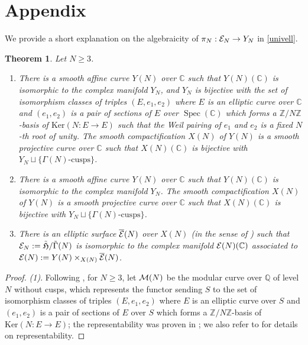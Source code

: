\documentclass[12pt,amstex,amssymb]{article}
\theoremstyle{plain}
\newtheorem{theorem}{Theorem}[subsection]
\theoremstyle{definition}
\def\cE{{\cal E}}
\def\fH{{\frak H}}
\def\cM{{\cal M}}
\def\Z{{\mathbb Z}}
\def\C{{\mathbb C}}
\def\Q{{\mathbb Q}}
\def\Ker{\text{Ker}}
\newcommand{\Spec}{\operatorname{Spec}}
\begin{document}
{\section{Appendix} \label{appendix}
We provide a short explanation on the algebraicity of $\pi_N:\cE_N \to Y_N$ in \eqref{univell}.
\begin{theorem}
    Let $N \geq 3$. 
    \begin{enumerate}[(1)]
            \item There is a smooth affine curve $Y(N)$ over $\C$ such that $Y(N)(\C)$ is isomorphic to the complex manifold $Y_N$, and $Y_N$ is bijective with the set of isomorphism classes of triples $(E,e_1,e_2)$ where $E$ is an elliptic curve over $\C$ and $(e_1,e_2)$ is a pair of sections of $E$ over $\Spec(\C)$ which forms a $\Z/N\Z$-basis of $\Ker(N:E \to E)$ such that the Weil pairing of $e_1$ and $e_2$ is a fixed $N$-th root of unity.
        The smooth compactification $X(N)$ of $Y(N)$ is a smooth projective curve over $\C$ such that  $X(N)(\C)$ is bijective with $Y_N \sqcup \{\Gamma(N)\text{-cusps}\}$.
        \item There is a smooth affine curve $Y(N)$ over $\C$ such that $Y(N)(\C)$ is isomorphic to the complex manifold $Y_N$. %
        The smooth compactification $X(N)$ of $Y(N)$ is a smooth projective curve over $\C$ such that  $X(N)(\C)$ is bijective with $Y_N \sqcup \{\Gamma(N)\text{-cusps}\}$.
    \item   There is an elliptic surface $\overline \cE(N)$ over $X(N)$ (in the sense of \cite[Definition on p 202]{Silverman}) such that $\cE_N:=\tilde \fH/\tilde \Gamma(N)$ is isomorphic to the complex manifold $\cE(N)(\C)$ associated to $\cE(N):=Y(N) \times_{X(N)} \overline \cE(N)$.
    \end{enumerate}
\end{theorem}
\begin{proof}
{\it(1)}. Following \cite[Section 1.1]{Kat}, for $N\geq 3$, let $\cM(N)$ be the modular curve over $\Q$ of level $N$ without cusps, which represents the functor sending $S$ to the set of isomorphism classes of triples $(E, e_1,e_2)$ where $E$ is an elliptic curve over $S$
and $(e_1,e_2)$ is a pair of sections of $E$ over $S$ which forms a $\Z/N\Z$-basis of $\Ker (N : E\to E)$; the representability was proven in \cite{DR}; we also refer to \cite[Proposition 1.10.12, Theorem 4.7.0, Corollary 4.7.1, and Corollary 4.7.2]{KatzMazur} for details on representability.

\end{proof}}
\end{document}
